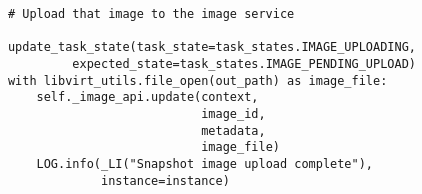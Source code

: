 \documentclass[a4paper,left=1.5cm,right=1.5cm,11pt]{article}
\begin{document}
\begin{lstlisting}
            # Upload that image to the image service

            update_task_state(task_state=task_states.IMAGE_UPLOADING,
                     expected_state=task_states.IMAGE_PENDING_UPLOAD)
            with libvirt_utils.file_open(out_path) as image_file:
                self._image_api.update(context,
                                       image_id,
                                       metadata,
                                       image_file)
                LOG.info(_LI("Snapshot image upload complete"),
                         instance=instance)
    \end{lstlisting}
\end{document}
